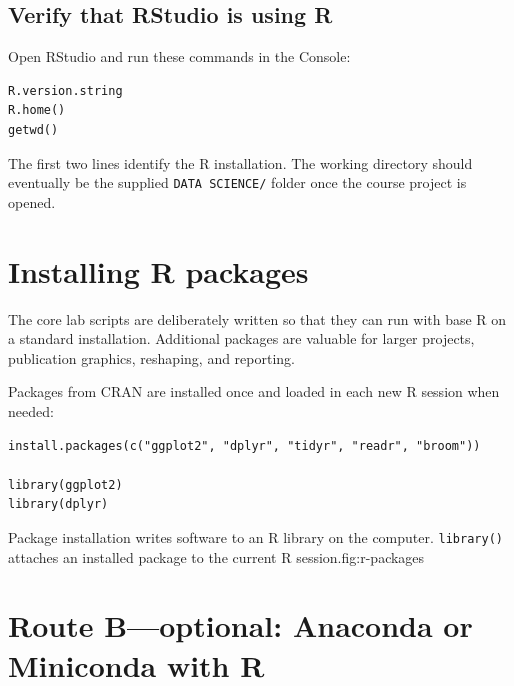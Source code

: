 \subsection{Verify that RStudio is using R}

Open RStudio and run these commands in the Console:

\begin{lstlisting}[style=dsr]
R.version.string
R.home()
getwd()
\end{lstlisting}

The first two lines identify the R installation. The working directory should eventually be the supplied \texttt{DATA SCIENCE/} folder once the course project is opened.

\section{Installing R packages}

The core lab scripts are deliberately written so that they can run with base R on a standard installation. Additional packages are valuable for larger projects, publication graphics, reshaping, and reporting.

Packages from CRAN are installed once and loaded in each new R session when needed:

\begin{lstlisting}[style=dsr]
install.packages(c("ggplot2", "dplyr", "tidyr", "readr", "broom"))

library(ggplot2)
library(dplyr)
\end{lstlisting}

\begin{utpfig}{Package installation writes software to an R library on the computer. \texttt{library()} attaches an installed package to the current R session.}{fig:r-packages}
\end{utpfig}

\section{Route B---optional: Anaconda or Miniconda with R}

